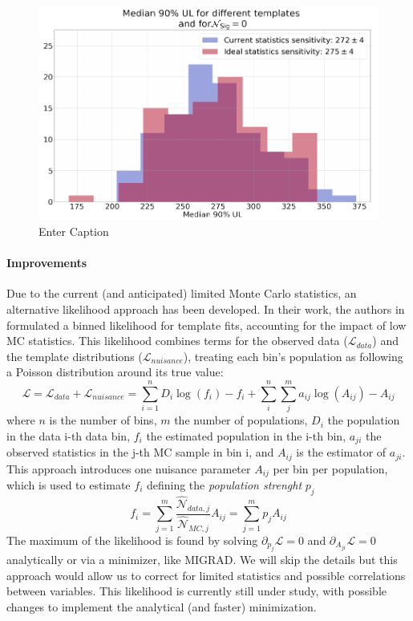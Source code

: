 \begin{refsection}
\begin{figure}
    \centering
    \includegraphics[width=\linewidth]{Figures/X17/Likelihood/likelihood_median_UL_test.png}
    \caption{Enter Caption}
    \label{fig:enter-label}
\end{figure}

\paragraph{Improvements}
Due to the current (and anticipated) limited Monte Carlo statistics, an alternative likelihood approach has been developed. 
In their work, the authors in \cite{X17:likelihood:BB} formulated a binned likelihood for template fits, accounting for the impact of low MC statistics. 
This likelihood combines terms for the observed data ($\mathcal{L}_{data}$) and the template distributions ($\mathcal{L}_{nuisance}$), treating each bin's population as following a Poisson distribution around its true value:
\begin{equation}
    \mathcal{L} = \mathcal{L}_{data} + \mathcal{L}_{nuisance} =
    \sum_{i=1}^n D_i \log (f_i) - f_i + \sum_{i}^{n}\sum_{j}^{m}a_{ij}\log (A_{ij})-A_{ij}
\end{equation}
where $n$ is the number of bins, $m$ the number of populations, $D_i$ the population in the data i-th data bin, $f_i$ the estimated population in the i-th bin, $a_{ji}$ the observed statistics in the j-th MC sample in bin i, and $A_{ij}$ is the estimator of $a_{ji}$.
This approach introduces one nuisance parameter $A_{ij}$ per bin per population, which is used to estimate $f_i$ defining the \textit{population strenght} $p_j$
\begin{equation}
    f_i=\sum_{j=1}^m \frac{\hat{\mathcal{N}}_{data,j}}{\hat{\mathcal{N}}_{MC,j}} A_{ij}= \sum_{j=1}^m p_j A_{ij}
\end{equation}
The maximum of the likelihood is found by solving $\partial_{p_j}\mathcal{L}=0$ and  $\partial_{A_{ji}}\mathcal{L}=0$ analytically or via a minimizer, like MIGRAD.
We will skip the details but this approach would allow us to correct for limited statistics and possible correlations between variables.
This likelihood is currently still under study, with possible changes to implement the analytical (and  faster) minimization.


\end{refsection}
